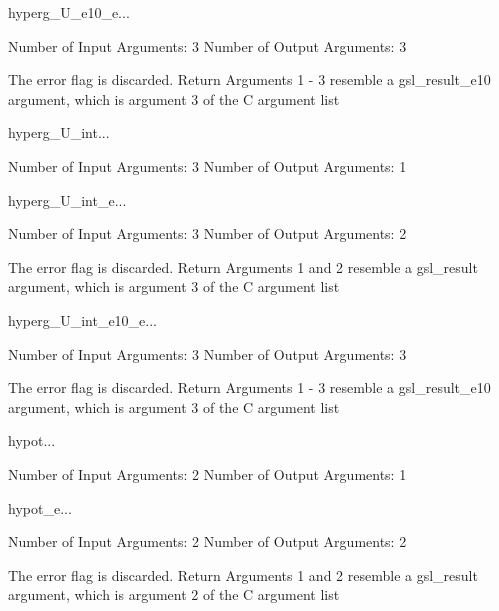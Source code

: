 \begin{funcdesc}{hyperg_U_e10_e}{...}

    Number of Input  Arguments:  3
    Number of Output Arguments:  3

The error flag is discarded.
Return Arguments 1 - 3 resemble a gsl_result_e10 argument,
	which is argument 3 of the C argument list

\end{funcdesc}

\begin{funcdesc}{hyperg_U_int}{...}

    Number of Input  Arguments:  3
    Number of Output Arguments:  1
\end{funcdesc}

\begin{funcdesc}{hyperg_U_int_e}{...}

    Number of Input  Arguments:  3
    Number of Output Arguments:  2

The error flag is discarded.
Return Arguments 1 and 2 resemble a gsl_result argument,
	which is  argument 3 of the C argument list

\end{funcdesc}

\begin{funcdesc}{hyperg_U_int_e10_e}{...}

    Number of Input  Arguments:  3
    Number of Output Arguments:  3

The error flag is discarded.
Return Arguments 1 - 3 resemble a gsl_result_e10 argument,
	which is argument 3 of the C argument list

\end{funcdesc}

\begin{funcdesc}{hypot}{...}

    Number of Input  Arguments:  2
    Number of Output Arguments:  1
\end{funcdesc}

\begin{funcdesc}{hypot_e}{...}

    Number of Input  Arguments:  2
    Number of Output Arguments:  2

The error flag is discarded.
Return Arguments 1 and 2 resemble a gsl_result argument,
	which is  argument 2 of the C argument list

\end{funcdesc}

